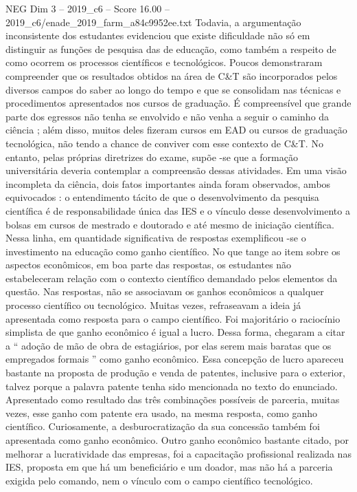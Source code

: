 \begin{textsample}{NEG Dim 3 – 2019\_c6 – Score 16.00 – 2019\_c6/enade\_2019\_farm\_a84c9952ee.txt}
Todavia, a argumentação inconsistente dos estudantes evidenciou que existe dificuldade não só em distinguir as funções de pesquisa das de educação, como também a respeito de como ocorrem os processos científicos e tecnológicos.
Poucos demonstraram compreender que os resultados obtidos na área de C\&T são incorporados pelos diversos campos do saber ao longo do tempo e que se consolidam nas técnicas e procedimentos apresentados nos cursos de graduação.
É compreensível que grande parte dos egressos não tenha se envolvido e não venha a seguir o caminho da ciência ; além disso, muitos deles fizeram cursos em EAD ou cursos de graduação tecnológica, não tendo a chance de conviver com esse contexto de C\&T.
No entanto, pelas próprias diretrizes do exame, supõe -se que a formação universitária deveria contemplar a compreensão dessas atividades.
Em uma visão incompleta da ciência, dois fatos importantes ainda foram observados, ambos equivocados : o entendimento tácito de que o desenvolvimento da pesquisa científica é de responsabilidade única das IES e o vínculo desse desenvolvimento a bolsas em cursos de mestrado e doutorado e até mesmo de iniciação científica.
Nessa linha, em quantidade significativa de respostas exemplificou -se o investimento na educação como ganho científico.
No que tange ao item sobre os aspectos econômicos, em boa parte das respostas, os estudantes não estabeleceram relação com o contexto científico demandado pelos elementos da questão.
Nas respostas, não se associavam os ganhos econômicos a qualquer processo científico ou tecnológico.
Muitas vezes, refraseavam a ideia já apresentada como resposta para o campo científico.
Foi majoritário o raciocínio simplista de que ganho econômico é igual a lucro.
Dessa forma, chegaram a citar a “ adoção de mão de obra de estagiários, por elas serem mais baratas que os empregados formais ” como ganho econômico.
Essa concepção de lucro apareceu bastante na proposta de produção e venda de patentes, inclusive para o exterior, talvez porque a palavra patente tenha sido mencionada no texto do enunciado.
Apresentado como resultado das três combinações possíveis de parceria, muitas vezes, esse ganho com patente era usado, na mesma resposta, como ganho científico.
Curiosamente, a desburocratização da sua concessão também foi apresentada como ganho econômico.
Outro ganho econômico bastante citado, por melhorar a lucratividade das empresas, foi a capacitação profissional realizada nas IES, proposta em que há um beneficiário e um doador, mas não há a parceria exigida pelo comando, nem o vínculo com o campo científico tecnológico.

\end{textsample}
